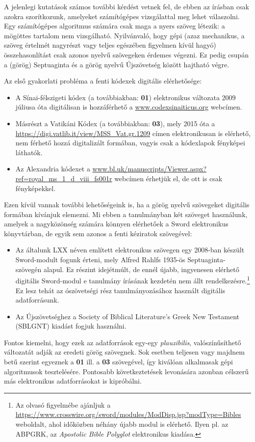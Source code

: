 \documentclass{article}
\begin{document}
A jelenlegi kutatások számos további kérdést vetnek fel, de ebben az írásban csak azokra szorítkozunk,
amelyeket számítógépes vizsgálattal meg lehet válaszolni. Egy számítógépes algoritmus számára
csak maga a nyers szöveg létezik: a mögöttes tartalom nem vizsgálható.
Nyilvánvaló, hogy gépi (azaz mechanikus,
a szöveg értelmét nagyrészt vagy teljes egészében figyelmen kívül hagyó) összehasonlítást csak
azonos nyelvű szövegeken érdemes végezni. Ez pedig csupán a (görög) Septuaginta és a görög nyelvű
Újszövetség között hajtható végre.

Az első gyakorlati probléma a fenti kódexek digitális elérhetősége:
\begin{itemize}
\item A Sínai-félszigeti kódex (a továbbiakban: \textbf{01})
elektronikus változata 2009 júliusa óta digitálisan is hozzáférhető a \url{www.codexsinaiticus.org} webcímen.
\item Másrészt a Vatikáni Kódex (a továbbiakban: \textbf{03}), mely
2015 óta a \url{https://digi.vatlib.it/view/MSS_Vat.gr.1209} címen elektronikusan is elérhető, nem férhető hozzá
digitalizált formában, vagyis csak a kódexlapok fényképei láthatók.
\item Az Alexandria kódexet a \url{www.bl.uk/manuscripts/Viewer.aspx?ref=royal_ms_1_d_viii_fs001r}
webcímen érhetjük el, de ott is csak fényképekkel.
\end{itemize}

Ezen kívül vannak további lehetőségeink is, ha a görög nyelvű szövegeket digitális formában kívánjuk
elemezni. Mi ebben a tanulmányban két szöveget használunk, amelyek a nagyközönség számára könnyen
elérhetőek a Sword \cite{Sword} elektronikus könyvtárban, de egyik sem azonos a fenti kéziratok szövegével:
\begin{itemize}
\item Az általunk LXX néven említett elektronikus szövegen egy 2008-ban készült Sword-modult fogunk érteni,
mely Alfred Rahlfs 1935-ös Septuaginta-szövegén alapul. Ez részint idejétmúlt, de ennél újabb, ingyenesen
elérhető digitális Sword-modul e tanulmány írásának kezdetén nem állt rendelkezésre.\footnote{
Az olvasó figyelmébe ajánljuk a \url{https://www.crosswire.org/sword/modules/ModDisp.jsp?modType=Bibles}
weboldalt, ahol időközben néhány újabb modul is elérhető. Ilyen pl. az ABPGRK, az \textit{Apostolic Bible Polyglot}
elektronikus kiadása.} Ez lesz tehát az ószövetségi
rész tanulmányozásához használt digitális adatforrásunk.
\item Az Újszövetséghez a Society of Biblical Literature's Greek New Testament
(SBLGNT) kiadást fogjuk használni.
\end{itemize}
Fontos kiemelni, hogy ezek az adatforrások egy-egy \textit{plauzibilis}, valószínűsíthető változatát adják
az eredeti görög szövegnek. Sok esetben teljesen vagy majdnem betű szerint egyeznek a \textbf{01} ill.
a \textbf{03} szövegével, így kiválóan alkalmasak gépi algoritmusok tesztelésére. Pontosabb következtetések
levonására azonban célszerű más elektronikus adatforrásokat is kipróbálni.
\end{document}
